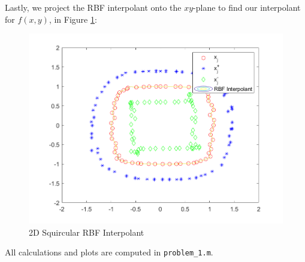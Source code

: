 \begin{solution}
  \pagebreak
  Lastly, we project the RBF interpolant onto the $xy$-plane to find our interpolant for $f(x, y)$, in Figure 
  \ref{fig:problem_1iii}:

  \begin{figure}[h]
    \centering
    \includegraphics*[width=\textwidth]{problem_1iii.png}
    \caption{2D Squircular RBF Interpolant}
    \label{fig:problem_1iii}
  \end{figure}

  All calculations and plots are computed in \texttt{problem\_1.m}.
\end{solution}